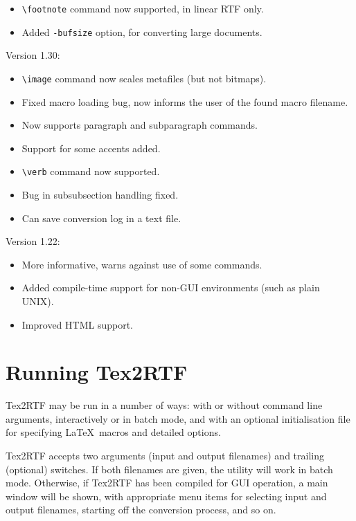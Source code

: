 \begin{itemize}
\itemsep=0pt
\item \verb$\footnote$ command now supported, in linear RTF only.
\item Added {\tt -bufsize} option, for converting large documents.
\end{itemize}

Version 1.30:

\begin{itemize}
\itemsep=0pt
\item \verb$\image$ command now scales metafiles (but not bitmaps).
\item Fixed macro loading bug, now informs the user of the found macro filename.
\item Now supports paragraph and subparagraph commands.
\item Support for some accents added.
\item \verb$\verb$ command now supported.
\item Bug in subsubsection handling fixed.
\item Can save conversion log in a text file.
\end{itemize}

Version 1.22:

\begin{itemize}
\itemsep=0pt
\item More informative, warns against use of some commands.
\item Added compile-time support for non-GUI environments (such as plain UNIX).
\item Improved HTML support.
\end{itemize}

\chapter{Running Tex2RTF}%
%
\setfooter{\thepage}{}{}{}{}{\thepage}%

Tex2RTF may be run in a number of ways: with or without command line arguments,
interactively or in batch mode, and with an optional initialisation file
for specifying \LaTeX\ macros and detailed options.

Tex2RTF accepts two arguments (input and output filenames) and trailing
(optional) switches.  If both filenames are given, the utility will work
in batch mode.  Otherwise, if Tex2RTF has been compiled for GUI
operation, a main window will be shown, with appropriate menu items for
selecting input and output filenames, starting off the conversion
process, and so on.

